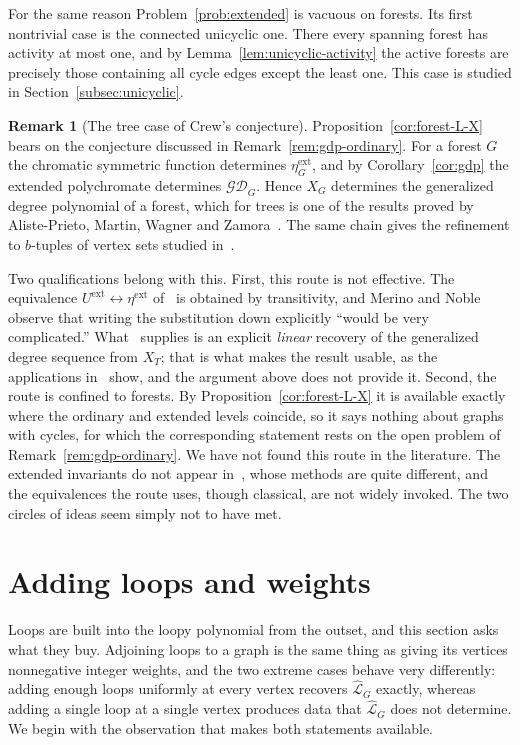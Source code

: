 \documentclass[11pt]{article}
\theoremstyle{plain}
\theoremstyle{definition}
\newtheorem{remark}[theorem]{Remark}
\renewcommand{\mathcal}{\mathscr}
\newcommand{\LL}{\mathcal{L}}    %
\numberwithin{equation}{section}
\begin{document}
For the same reason Problem~\ref{prob:extended} is vacuous on forests.
Its first nontrivial case is the connected unicyclic one.  There every spanning
forest has activity at most one, and by
Lemma~\ref{lem:unicyclic-activity} the active forests are precisely those containing
all cycle edges except the least one.  This case is studied in
Section~\ref{subsec:unicyclic}.

\begin{remark}[The tree case of Crew's conjecture]\label{rem:crew-trees}
Proposition~\ref{cor:forest-L-X} bears on the conjecture discussed in
Remark~\ref{rem:gdp-ordinary}.  For a forest $G$ the chromatic symmetric
function determines $\eta^{\mathrm{ext}}_G$, and by
Corollary~\ref{cor:gdp} the extended polychromate determines
$\mathcal{GD}_G$.  Hence $X_G$ determines the generalized degree polynomial
of a forest, which for trees is one of the results proved by Aliste-Prieto,
Martin, Wagner and Zamora~\cite{AMWZ}.  The same chain gives the refinement
to $b$-tuples of vertex sets studied in~\cite{LT}.

Two qualifications belong with this.  First, this route is not effective.
The equivalence $U^{\mathrm{ext}}\leftrightarrow\eta^{\mathrm{ext}}$
of~\cite[Corollary~4.13]{MN} is obtained by transitivity, and Merino and
Noble observe that writing the substitution down explicitly ``would be very
complicated.''  What~\cite{AMWZ} supplies is an explicit \emph{linear}
recovery of the generalized degree sequence from $X_T$; that is what makes
the result usable, as the applications in~\cite{LT} show, and the argument
above does not provide it.  Second, the route is confined to forests.  By
Proposition~\ref{cor:forest-L-X} it is available exactly where the ordinary
and extended levels coincide, so it says nothing about graphs with cycles,
for which the corresponding statement rests on the open problem of
Remark~\ref{rem:gdp-ordinary}.  We have not found this route in the literature.
The extended invariants do not appear in~\cite{AMWZ}, whose methods are quite different,
and the equivalences the route uses, though classical, are not widely invoked.
The two circles of ideas seem simply not to have met.
\end{remark}

\section{Adding loops and weights}\label{sec:loops-weights}

Loops are built into the loopy polynomial from the outset, and this
section asks what they buy.  Adjoining loops to a graph is the same thing
as giving its vertices nonnegative integer weights, and the two extreme
cases behave very differently: adding enough loops uniformly at every vertex
recovers $\widehat{\LL}_G$ exactly, whereas adding a single loop at a
single vertex produces data that $\widehat{\LL}_G$ does not determine.
We begin with the observation that makes both statements available.
\end{document}
